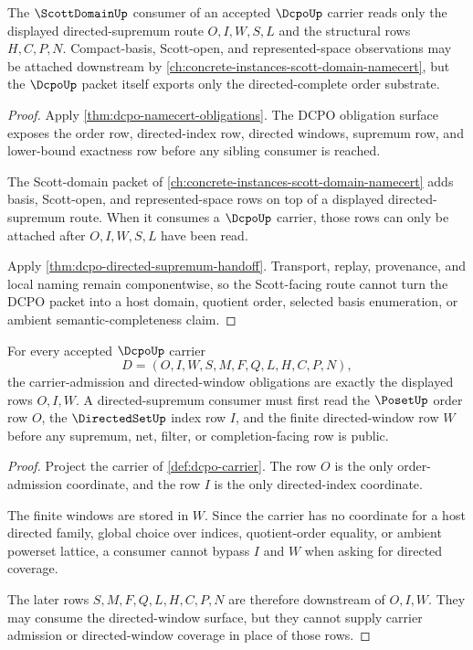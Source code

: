 \begin{theorem}
\label{thm:dcpo-scott-domain-compatibility}
The $\ScottDomainUp$ consumer of an accepted $\DcpoUp$ carrier reads only the displayed directed-supremum route $O,I,W,S,L$ and the structural rows $H,C,P,N$. Compact-basis, Scott-open, and represented-space observations may be attached downstream by \autoref{ch:concrete-instances-scott-domain-namecert}, but the $\DcpoUp$ packet itself exports only the directed-complete order substrate.
\end{theorem}
\begin{proof}
Apply \autoref{thm:dcpo-namecert-obligations}. The DCPO obligation surface exposes the order row, directed-index row, directed windows, supremum row, and lower-bound exactness row before any sibling consumer is reached.

The Scott-domain packet of \autoref{ch:concrete-instances-scott-domain-namecert} adds basis, Scott-open, and represented-space rows on top of a displayed directed-supremum route. When it consumes a $\DcpoUp$ carrier, those rows can only be attached after $O,I,W,S,L$ have been read.

Apply \autoref{thm:dcpo-directed-supremum-handoff}. Transport, replay, provenance, and local naming remain componentwise, so the Scott-facing route cannot turn the DCPO packet into a host domain, quotient order, selected basis enumeration, or ambient semantic-completeness claim.
\end{proof}

\begin{theorem}
\label{thm:dcpo-carrier-directed-obligations}
For every accepted $\DcpoUp$ carrier
$$
D=(O,I,W,S,M,F,Q,L,H,C,P,N),
$$
the carrier-admission and directed-window obligations are exactly the displayed
rows $O,I,W$. A directed-supremum consumer must first read the $\PosetUp$ order
row $O$, the $\DirectedSetUp$ index row $I$, and the finite directed-window row
$W$ before any supremum, net, filter, or completion-facing row is public.
\end{theorem}
\begin{proof}
Project the carrier of \autoref{def:dcpo-carrier}. The row $O$ is the only
order-admission coordinate, and the row $I$ is the only directed-index
coordinate.

The finite windows are stored in $W$. Since the carrier has no coordinate for a
host directed family, global choice over indices, quotient-order equality, or
ambient powerset lattice, a consumer cannot bypass $I$ and $W$ when asking for
directed coverage.

The later rows $S,M,F,Q,L,H,C,P,N$ are therefore downstream of $O,I,W$. They
may consume the directed-window surface, but they cannot supply carrier
admission or directed-window coverage in place of those rows.
\end{proof}

